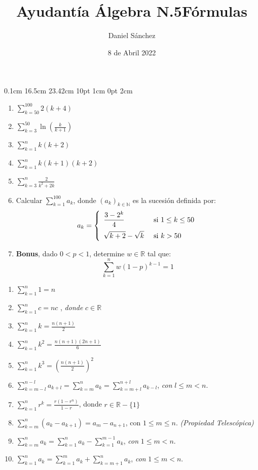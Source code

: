 \documentclass[12pt]{article}
\newcommand{\D}{\displaystyle}
\begin{document}
\setmargins{2.5cm}
{0.1cm}
{16.5cm}
{23.42cm}
{10pt}
{1cm}
{0pt}
{2cm}

\title{Ayudant\'ia \'Algebra N.5}
\date{8 de Abril 2022}
\author{Daniel S\'anchez}
\maketitle

\begin{enumerate}
      \item $\D \sum_{k = 50}^{100} 2(k+4)$
      \item $\D \sum_{k = 3}^{50} \ln \left(\frac{k}{k+1}\right)$
      \item $\D \sum_{k = 1}^{n} k(k+2)$
      \item $\D \sum_{k = 1}^{n} k(k+1)(k+2)$
      \item $\D \sum_{k = 3}^{n} \frac{2}{k^2+2k}$
      \item Calcular $\D \sum_{k=1}^{100} a_k$, donde $(a_k)_{k \in \mathbb{N}}$ es la sucesi\'on definida por:
            $$a_k=\left\{
                  \begin{array}{ll}
                        \D \frac{3-2^k}{4}     & \mbox{ si } 1 \leq k \leq 50 \\[3\jot]
                        \D \sqrt{k+2}-\sqrt{k} & \mbox{ si } k > 50
                  \end{array}
                  \right.$$
      \item \textbf{Bonus}, dado $0 < p < 1$, determine $w \in \mathbb{R}$ tal que:
            $$\D \sum_{k = 1}^{n} w(1-p)^{k-1} = 1$$
\end{enumerate}


\pagebreak
\title{\LARGE{\textbf{F\'ormulas}}}
\maketitle
\begin{enumerate}
      \item $\D \sum_{k = 1}^{n} 1 = n $
      \item $\D \sum_{k = 1}^{n} c = nc $ , \textit{donde} $c \in \mathbb{R}$
      \item $\D \sum_{k = 1}^{n} k = \frac{n(n+1)}{2} $
      \item $\D \sum_{k = 1}^{n} k^2 = \frac{n(n+1)(2n+1)}{6} $
      \item $\D \sum_{k = 1}^{n} k^3 = {\left(\frac{n(n+1)}{2}\right)}^2 $
      \item $\D \sum_{k = m-l}^{n-l} a_{k+l} = \sum_{k = m}^{n} a_k = \sum_{k = m+l}^{n+l} a_{k-l}$, \textit{con} $l \leq m < n$.
      \item $\D \sum_{k = 1}^{n} r^k = \frac{r(1-r^n)}{1-r} $, donde $r \in \mathbb{R}-\{1\}$
      \item $\D \sum_{k = m}^{n} (a_k-a_{k+1}) = a_m-a_{n+1}$, con $1\leq m \leq n$. \textit{(Propiedad Telesc\'opica)}
      \item $\D \sum_{k = m}^{n} a_k = \sum_{k = 1}^{n} a_k - \sum_{k = 1}^{m-1} a_k $, \textit{con} $1 \leq m < n$.
      \item $\D \sum_{k = 1}^{n} a_k = \sum_{k = 1}^{m} a_k + \sum_{k = m+1}^{n} a_k $, \textit{con} $1 \leq m < n$.
\end{enumerate}
\end{document}
